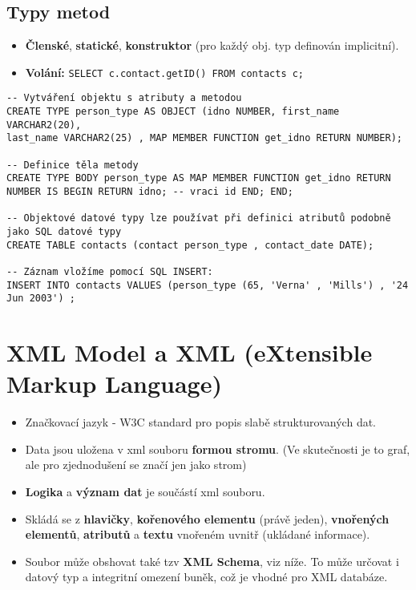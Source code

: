 \subsection{Typy metod}
\begin{itemize}
  \item \textbf{Členské}, \textbf{statické}, \textbf{konstruktor} (pro každý obj. typ definován implicitní).
  \item \textbf{Volání:} \texttt{SELECT c.contact.getID() FROM contacts c;}
\end{itemize}

\begin{verbatim}
-- Vytváření objektu s atributy a metodou
CREATE TYPE person_type AS OBJECT (idno NUMBER, first_name VARCHAR2(20), 
last_name VARCHAR2(25) , MAP MEMBER FUNCTION get_idno RETURN NUMBER);

-- Definice těla metody
CREATE TYPE BODY person_type AS MAP MEMBER FUNCTION get_idno RETURN 
NUMBER IS BEGIN RETURN idno; -- vraci id END; END;

-- Objektové datové typy lze používat při definici atributů podobně jako SQL datové typy
CREATE TABLE contacts (contact person_type , contact_date DATE);

-- Záznam vložíme pomocí SQL INSERT:
INSERT INTO contacts VALUES (person_type (65, 'Verna' , 'Mills') , '24 Jun 2003') ;
\end{verbatim}

\section{XML Model a XML (eXtensible Markup Language)}
\begin{itemize}
  \item Značkovací jazyk - W3C standard pro popis slabě strukturovaných dat.
  \item Data jsou uložena v xml souboru \textbf{formou stromu}. (Ve skutečnosti je to graf, ale pro zjednodušení se značí jen jako strom)
  \item \textbf{Logika} a \textbf{význam dat} je součástí xml souboru.
  \item Skládá se z \textbf{hlavičky}, \textbf{kořenového elementu} (právě jeden), \textbf{vnořených elementů}, \textbf{atributů} a \textbf{textu} vnořeném uvnitř (ukládané informace).
  \item Soubor může obshovat také tzv \textbf{XML Schema}, viz níže. To může určovat i datový typ a integritní omezení buněk, což je vhodné pro XML databáze.
\end{itemize}

